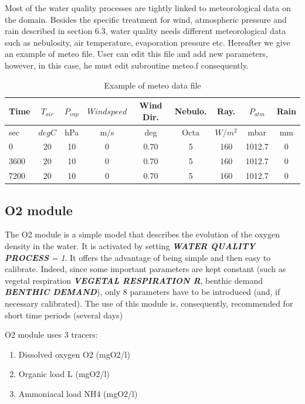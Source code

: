  Most of the water quality processes are tightly linked to meteorological data on the domain. Besides the specific treatment for wind, atmospheric pressure and rain described in section 6.3, water quality needs different meteorological data such as nebulosity, air temperature, evaporation pressure etc. Hereafter we give an example of meteo file. User can edit this file and add new parameters, however, in this case, he must edit subroutine meteo.f consequently.

\begin{table}
    \centering
  \begin{tabular}{|l|c|c|c|c|c|c|c|c|}
     \hline \hline
     Time & $T_{air}$ & $P_{vap}$ & $Wind speed$ & Wind Dir. & Nebulo. & Ray. & $P_{atm}$ & Rain \\
     \hline \hline
     sec & $deg C $ & hPa & m/s & deg & Octa & $W/m^2$ & mbar & mm \\
     \hline \hline
     0 & 20 & 10 & 0 & 0.70 & 5 & 160 & 1012.7 & 0 \\
     3600 & 20 & 10 & 0 & 0.70 & 5 & 160 & 1012.7 & 0 \\
     7200 & 20 & 10 & 0 & 0.70 & 5 & 160 & 1012.7 & 0 \\
     \hline
   \end{tabular}
  \caption{Example of meteo data file }\label{meteo}
\end{table} 


\subsection{ O2 module}



 The O2 module is a simple model that describes the evolution of the oxygen density in the water. It is activated by setting \textbf{\textit{WATER QUALITY PROCESS}}\textit{ = 1}. It offers the advantage of being simple and then easy to calibrate. Indeed, since some important parameters are kept constant (such as vegetal respiration \textbf{\textit{VEGETAL RESPIRATION R}}, benthic demand \textbf{\textit{BENTHIC DEMAND}}), only 8 parameters have to be introduced (and, if necessary calibrated). The use of this module is, consequently, recommended for short time periods (several days)

 O2 module uses 3 tracers:

\begin{enumerate}
\item  Dissolved oxygen O2 (mgO2/l)

\item  Organic load L (mgO2/l)

\item  Ammoniacal load NH4 (mgO2/l)
\end{enumerate}

